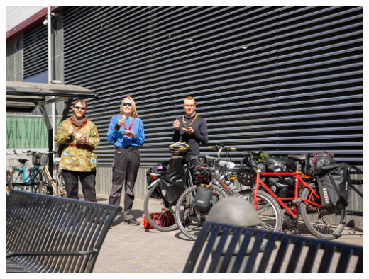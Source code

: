\documentclass[10pt,finnish,a5paper,headings=small,twoside=semi]{scrartcl}
\begin{document}
\begin{multicols}{2}
\begin{center}
		\noindent\includegraphics[width=0.94\linewidth]{assets/pyörävaellus9}
	\end{center}

	\columnbreak


\end{multicols}
\end{document}
